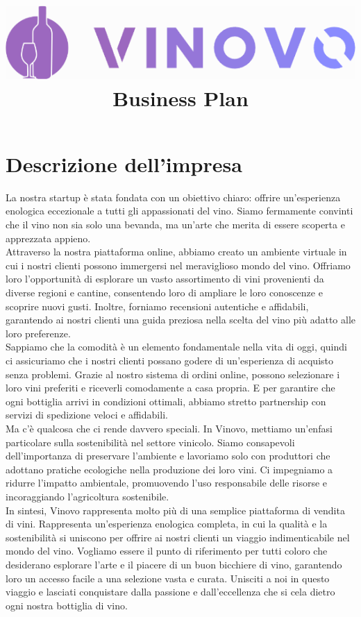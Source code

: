 \documentclass[12pt, a4paper]{article}
\title{
    \includegraphics[width=.8\textwidth]{images/LOGO.png}\\
    \textbf{Business Plan}
}
\date{}
\author{}
\newcommand{\meskip}{\medskip \\}
\begin{document}
\maketitle

\newpage

\tableofcontents

\newpage

\section{Descrizione dell'impresa}
La nostra startup è stata fondata con un obiettivo chiaro: offrire un'esperienza enologica eccezionale a tutti gli appassionati del vino.
Siamo fermamente convinti che il vino non sia solo una bevanda, ma un'arte che merita di essere scoperta e apprezzata appieno.\meskip
Attraverso la nostra piattaforma online, abbiamo creato un ambiente virtuale in cui i nostri clienti possono immergersi nel meraviglioso mondo del vino. Offriamo loro l'opportunità di esplorare un vasto assortimento di vini provenienti da diverse regioni e cantine, consentendo loro di ampliare le loro conoscenze e scoprire nuovi gusti. Inoltre, forniamo recensioni autentiche e affidabili, garantendo ai nostri clienti una guida preziosa nella scelta del vino più adatto alle loro preferenze.\meskip
Sappiamo che la comodità è un elemento fondamentale nella vita di oggi, quindi ci assicuriamo che i nostri clienti possano godere di un'esperienza di acquisto senza problemi. Grazie al nostro sistema di ordini online, possono selezionare i loro vini preferiti e riceverli comodamente a casa propria. E per garantire che ogni bottiglia arrivi in condizioni ottimali, abbiamo stretto partnership con servizi di spedizione veloci e affidabili.\meskip
Ma c'è qualcosa che ci rende davvero speciali.
In Vinovo, mettiamo un'enfasi particolare sulla sostenibilità nel settore vinicolo.
Siamo consapevoli dell'importanza di preservare l'ambiente e lavoriamo solo con produttori che adottano pratiche ecologiche nella produzione dei loro vini.
Ci impegniamo a ridurre l'impatto ambientale, promuovendo l'uso responsabile delle risorse e incoraggiando l'agricoltura sostenibile.\meskip
In sintesi, Vinovo rappresenta molto più di una semplice piattaforma di vendita di vini. Rappresenta un'esperienza enologica completa, in cui la qualità e la sostenibilità si uniscono per offrire ai nostri clienti un viaggio indimenticabile nel mondo del vino. Vogliamo essere il punto di riferimento per tutti coloro che desiderano esplorare l'arte e il piacere di un buon bicchiere di vino, garantendo loro un accesso facile a una selezione vasta e curata.
Unisciti a noi in questo viaggio e lasciati conquistare dalla passione e dall'eccellenza che si cela dietro ogni nostra bottiglia di vino.
\end{document}
